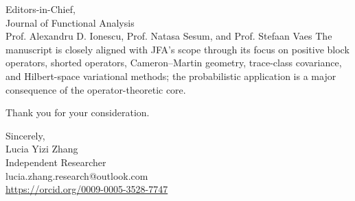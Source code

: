 \documentclass[11pt]{letter}
\begin{document}
\begin{letter}{Editors-in-Chief, \\ Journal of Functional Analysis\\
Prof. Alexandru D. Ionescu, Prof. Natasa Sesum, and Prof. Stefaan Vaes}
The manuscript is closely aligned with JFA’s scope through its focus on positive block operators, shorted operators, Cameron--Martin geometry, trace-class covariance, and Hilbert-space variational methods; the probabilistic application is a major consequence of the operator-theoretic core.

Thank you for your consideration.

\closing{Sincerely,\\
Lucia Yizi Zhang \\
Independent Researcher\\
lucia.zhang.research@outlook.com\\
{\small\mbox{\href{https://orcid.org/0009-0005-3528-7747}{https://orcid.org/0009-0005-3528-7747}}}}

\end{letter}
\end{document}
